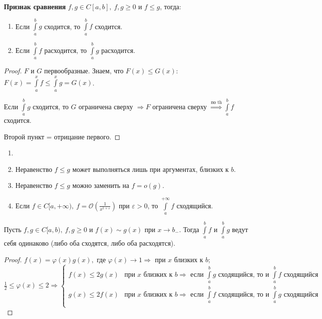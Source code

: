 \begin{corollary}
    \textbf{Признак сравнения}
    $f, g\in C[a,b],\ f,g\geq 0$ и $f\leq g$, тогда:

    \begin{enumerate}
        \item Если $\int\limits_a^b g$ сходится, то $\int\limits_a^b f$ сходится.

        \item Если $\int\limits_a^b f$ расходится, то $\int\limits_a^b g$ расходится.
    \end{enumerate}
\end{corollary}

\begin{proof}
    $F$ и $G$ первообразные. Знаем, что $F(x)\leq G(x)$: $F(x)=\int\limits_a^x f \leq \int\limits_a^x g=G(x)$.

    Если $\int\limits_a^b g$ сходится, то $G$ ограничена сверху $\Rightarrow F$ ограничена сверху $\overset{\text{по th}}{\Rightarrow}\int\limits_a^b f$ сходится.

    Второй пункт = отрицание первого.
\end{proof}

\begin{remark}
    \begin{enumerate}
        \item[]
        \item Неравенство $f\leq g$ может выполняться лишь при аргументах, близких к $b$.
        \item Неравенство $f\leq g$ можно заменить на $f=o(g)$.
        \item Если $f\in C[a,+\infty),\ f=\mathcal{O}(\frac{1}{x^{1+\varepsilon}})$ при $\varepsilon>0$, то $\int\limits_a^{+\infty} f$ сходящийся.
    \end{enumerate}
\end{remark}

\begin{corollary}
    Пусть $f,g\in C[a,b),\ f,g\geq 0$ и $f(x)\sim g(x)$ при $x\rightarrow b_-$. Тогда $\int\limits_a^b f$ и $\int\limits_a^b g$ ведут себя одинаково (либо оба сходятся, либо оба расходятся).
\end{corollary}

\begin{proof}
    $f(x)=\varphi(x)g(x),$ где $\varphi(x)\rightarrow 1\Rightarrow$ при $x$ близких к $b$; $\frac{1}{2}\leq \varphi(x)\leq 2\Rightarrow \begin{cases}
                                                                                                                                            f(x) \leq 2 g(x) & \text{при $x$ близких к $b\Rightarrow$ если $\int\limits_a^b g$ сходящийся, то и $\int\limits_a^b f$ сходящийся} \\
                                                                                                                                            g(x) \leq 2 f(x) & \text{при $x$ близких к $b\Rightarrow$ если $\int\limits_a^b f$ сходящийся, то и $\int\limits_a^b g$ сходящийся} \\
    \end{cases}$
\end{proof}

